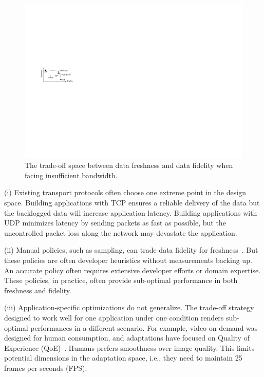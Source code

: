 \begin{figure}
  \centering
  \includegraphics[width=0.9\linewidth]{figures/intro.pdf}
  \caption{The trade-off space between data freshness and data fidelity when
    facing insufficient bandwidth.}
  \label{fig:intro}
  \vspace{-1em}
\end{figure}

(i) Existing transport protocols often choose one extreme point in the design
space. Building applications with TCP ensures a reliable delivery of the data
but the backlogged data will increase application latency. Building applications
with UDP minimizes latency by sending packets as fast as possible, but the
uncontrolled packet loss along the network may devastate the application.

(ii) Manual policies, such as sampling, can trade data fidelity for
freshness~\cite{rabkin2014aggregation}. But these policies are often developer
heuristics without measurements backing up. An accurate policy often requires
extensive developer efforts or domain expertise. These policies, in practice,
often provide sub-optimal performance in both freshness and fidelity.

(iii) Application-specific optimizations do not generalize. The trade-off
strategy designed to work well for one application under one condition renders
sub-optimal performances in a different scenario. For example, video-on-demand
was designed for human consumption, and adaptations have focused on Quality of
Experience (QoE)~\cite{yin2015control}. Humans prefers smoothness over image
quality. This limits potential dimensions in the adaptation space, i.e., they
need to maintain 25 frames per seconds (FPS).

